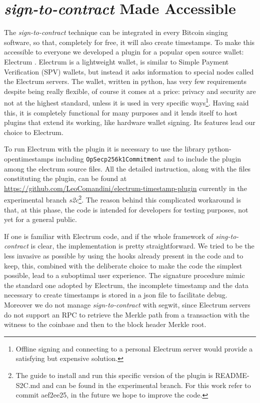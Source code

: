 \section{\textit{sign-to-contract} Made Accessible}
The \textit{sign-to-contract} technique can be integrated in every Bitcoin singing software, so that, completely for free, it will also create timestamps.
To make this accessible to everyone we developed a plugin for a popular open source wallet: Electrum \cite{ElectrumWeb} \cite{ElectrumGithub}. 
Electrum is a lightweight wallet, is similar to Simple Payment Verification (SPV) wallets, but instead it asks information to special nodes called the Electrum servers. The wallet, written in python, has very few requirements despite being really flexible, of course it comes at a price: privacy and security are not at the highest standard, unless it is used in very specific ways\footnote{Offline signing and connecting to a personal Electrum server would provide a satisfying but expensive solution.}.
Having said this, it is completely functional for many purposes and it lends itself to host plugins that extend its working, like hardware wallet signing. 
Its features lead our choice to Electrum.

To run Electrum with the plugin it is necessary to use the library python-opentimestamps including \verb|OpSecp256k1Commitment| and to include the plugin among the electrum source files. All the detailed instruction, along with the files constituting the plugin, can be found at \url{https://github.com/LeoComandini/electrum-timestamp-plugin} currently in the experimental branch \textit{s2c}\footnote{The guide to install and run this specific version of the plugin is README-S2C.md and can be found in the experimental branch. For this work refer to commit aef2ee25, in the future we hope to improve the code.}. The reason behind this complicated workaround is that, at this phase, the code is intended for developers for testing purposes, not yet for a general public.

If one is familiar with Electrum code, and if the whole framework of \textit{sing-to-contract} is clear, the implementation is pretty straightforward.  We tried to be the less invasive as possible by using the hooks already present in the code and to keep, this, combined with the deliberate choice to make the code the simplest possible, lead to a suboptimal user experience. 
The signature procedure mimic the standard one adopted by Electrum, the incomplete timestamp and the data necessary to create timestamps is stored in a json file to facilitate debug.
Moreover we do not manage \textit{sign-to-contract} with segwit, since Electrum servers do not support an RPC to retrieve the Merkle path from a transaction with the witness to the coinbase and then to the block header Merkle root.

